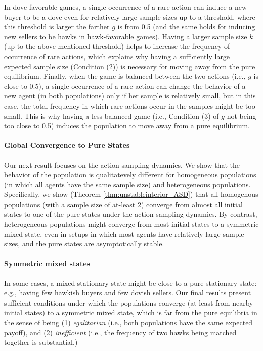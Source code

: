 \documentclass[12pt]{article}
\numberwithin{equation}{section}
\numberwithin{figure}{section}
\theoremstyle{definition}
\theoremstyle{plain}
\theoremstyle{plain}
\theoremstyle{plain}
\theoremstyle{remark}
\theoremstyle{plain}
\theoremstyle{plain}
\begin{document}
In dove-favorable games, a single occurrence of a rare action can induce a new buyer to be a dove  even for 
relatively large sample sizes up to a threshold, 
where this threshold is larger the farther $g$ is from 0.5 
(and the same holds for inducing new sellers to be hawks in hawk-favorable games). Having a larger sample size $k$ %
(up to the above-mentioned threshold) helps to increase the frequency of occurrence of rare actions,  which explains why having a sufficiently large expected sample size (Condition (2)) is necessary for moving away from the pure equilibrium. Finally, when the game is balanced between the two actions (i.e., $g$ is close to 0.5), a single occurrence of a rare action can change the behavior of a new agent (in both populations) only if her sample is relatively small, but in this case, the total frequency in which rare actions occur in the samples might be too small. This is why having a less balanced game 
(i.e., Condition (3) of $g$ not being too close to 0.5) induces the population to move away from a pure equilibrium.

\paragraph{Global Convergence to Pure States} 
Our next result focuses on the action-sampling dynamics. We show that the behavior of the population is qualitatevely different for homogeneous populations (in which all agents have the same sample size) and heterogeneous populations. Specifically, we show (Theorem \ref{thm:unstableinterior_ASD}) that all homogenous populations (with a sample size of at-least 2) converge from almost all initial states to one of the pure states under the action-sampling dynamics. By contrast, heterogeneous populations might converge from most initial states to a symmetric mixed state, even in setups in which most agents have relatively large sample sizes, and the pure states are asymptotically stable.

\paragraph{Symmetric mixed states}
In some cases, a mixed stationary state might be close to a pure stationary state: e.g., having few hawkish buyers and few dovish sellers. Our final results present sufficient  conditions under which the populations converge (at least from nearby initial states) to a symmetric mixed state, which is far from the pure equilibria in the sense of being  (1) \emph{egalitarian} (i.e., both populations have the same expected payoff), and (2) \emph{inefficient} (i.e., the frequency of two hawks being matched together is substantial.)
\end{document}

